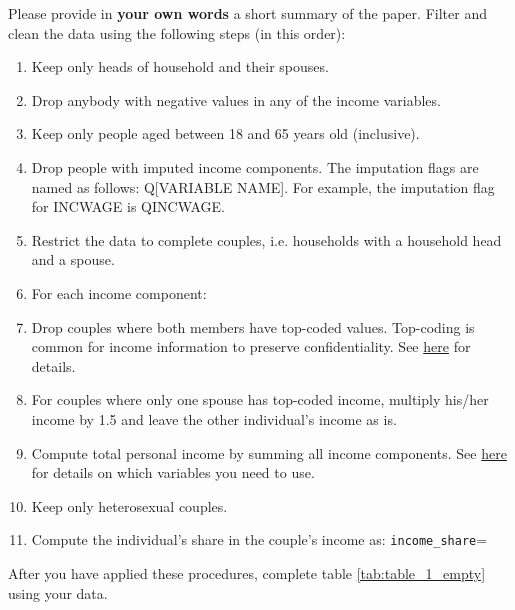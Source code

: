 \documentclass[a4paper, 11pt,addpoints,answers]{exam}
\begin{document}
\begin{questions}
	\question[5] 	
	Please provide in \textbf{your own words} a short summary of the paper.  
	\question[15] \label{clean:first} Filter and clean the data using the following steps (in this order):
	\begin{enumerate}[label=(\alph*)]
		\item Keep only heads of household and their spouses.
		\item Drop anybody with negative values in any of the income variables.
		\item Keep only people aged between 18 and 65 years old (inclusive).
		\item Drop people with imputed income components. The imputation flags are named as follows: Q[VARIABLE NAME]. For example, the imputation flag for INCWAGE is QINCWAGE.\label{step:first}
		\item Restrict the data to complete couples, i.e. households with a household head and a spouse.
		\item For each income component: \label{step:last}
		\bitem 
		\item Drop couples where both members have top-coded values.  Top-coding is common for income information to preserve confidentiality. See \href{https://faculty.chicagobooth.edu/-/media/faculty/emir-kamenica/documents/identityonlineappendix.pdf}{here} for details.
		\item For couples where only one spouse has top-coded income, multiply his/her income by 1.5 and leave the other individual's income as is.
		\eitem 
		\item Compute total personal income by summing all income components. See \href{https://usa.ipums.org/usa-action/variables/INCTOT#comparability_section}{here} for details on which variables you need to use.
		\item Keep only heterosexual couples.
		\item Compute the individual's share in the couple's income as:
		\beqn
			{\tt income\_share}=
		\eeqn
	\end{enumerate}
	After you have applied these procedures, complete table \ref{tab:table_1_empty} using your data.
	
	
	
	\begin{solution}
		
	\end{solution}	
	

\end{questions}
\end{document}
